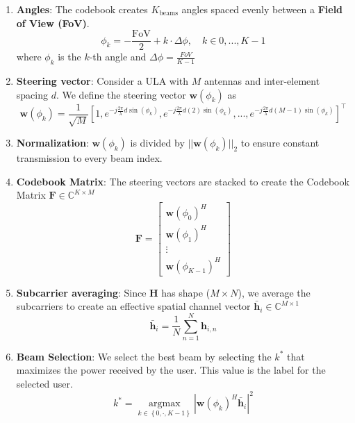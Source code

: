 \begin{enumerate}
    \item \textbf{Angles}: The codebook creates $K_{\text{beams}}$ angles spaced evenly between a \textbf{Field of View (FoV)}.
    \begin{equation}
            \phi_k = - \frac{\text{FoV}}{2} + k \cdot \Delta \phi , \quad k \in {0, ..., K-1}
    \end{equation}
    where $\phi_k$ is the $k$-th angle and $\Delta \phi = \frac{FoV}{K-1}$
    \item \textbf{Steering vector}: Consider a ULA with $M$ antennas and inter-element spacing $d$. We define the steering vector $\mathbf{w} \left( \phi_k\right)$ as
    \begin{equation}
            \mathbf{w} \left( \phi_k\right) = \frac{1}{\sqrt{M}} \left[ 1, e^{-j \frac{2 \pi}{\lambda} d \sin \left( \phi_k \right) }, e^{-j \frac{2 \pi}{\lambda} d (2) \sin \left( \phi_k \right) }, ..., e^{-j \frac{2 \pi}{\lambda} d \left( M-1 \right) \sin \left( \phi_k \right) }\right] ^{\top}
    \end{equation}
    \item \textbf{Normalization}: $\mathbf{w} \left( \phi_k\right)$ is divided by $|| \mathbf{w} \left( \phi_k\right) ||_{2}$ to ensure constant transmission to every beam index.
    \item \textbf{Codebook Matrix}: The steering vectors are stacked to create the Codebook Matrix $\mathbf{F} \in \mathbb{C}^{K \times M}$
    \begin{equation}
            \mathbf{F} = \begin{bmatrix} \mathbf{w}(\phi_0)^H \\ \mathbf{w}(\phi_1)^H \\ \vdots \\ \mathbf{w}(\phi_{K-1})^H \end{bmatrix}
    \end{equation}
    \item \textbf{Subcarrier averaging}: Since $\mathbf{H}$ has shape ($M \times N$), we average the subcarriers to create an effective spatial channel vector $\bar{\mathbf{h}}_i \in \mathbb{C}^{M \times 1}$
    \begin{equation}
            \bar{\mathbf{h}}_i = \frac{1}{N} \sum_{n=1}^{N} \mathbf{h}_{i,n}
    \end{equation}
    \item \textbf{Beam Selection}: We select the best beam by selecting the $k^{*}$ that maximizes the power received by the user. This value is the label for the selected user.
    \begin{equation}
            k^{*} = \operatorname*{argmax}_{k \in \left\{ 0, \cdot, K-1\right\}} \left| \mathbf{w}(\phi_k)^H  \bar{\mathbf{h}}_i \right|^2
    \end{equation}
\end{enumerate}

